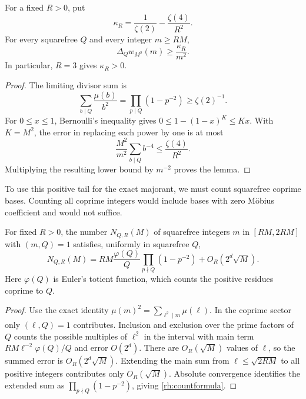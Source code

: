 \begin{lemma}\label{rh:positive}
For a fixed \(R>0\), put
\begin{equation}\label{rh:cr}
\kappa_R=\frac1{\zeta(2)}-\frac{\zeta(4)}{R^2}.
\end{equation}
For every squarefree \(Q\) and every integer \(m\ge RM\),
\begin{equation}\label{rh:positivebound}
\Delta_Qw_{M^2}(m)\ge\frac{\kappa_R}{m^2}.
\end{equation}
In particular, \(R=3\) gives \(\kappa_R>0\).
\end{lemma}

\begin{proof}
The limiting divisor sum is
\[
\sum_{b\mid Q}\frac{\mu(b)}{b^2}
=\prod_{p\mid Q}(1-p^{-2})\ge\zeta(2)^{-1}.
\]
For \(0\le x\le1\), Bernoulli's inequality gives
\(0\le1-(1-x)^K\le Kx\). With \(K=M^2\), the error in replacing each power by one is at most
\[
\frac{M^2}{m^2}\sum_{b\mid Q}b^{-4}
\le\frac{\zeta(4)}{R^2}.
\]
Multiplying the resulting lower bound by \(m^{-2}\) proves the lemma.
\end{proof}

To use this positive tail for the exact majorant, we must count squarefree coprime bases. Counting all coprime integers would include bases with zero Möbius coefficient and would not suffice.

\begin{lemma}\label{rh:count}
For fixed \(R>0\), the number \(N_{Q,R}(M)\) of squarefree integers \(m\) in \([RM,2RM]\) with \((m,Q)=1\) satisfies, uniformly in squarefree \(Q\),
\begin{equation}\label{rh:countformula}
N_{Q,R}(M)=RM\frac{\varphi(Q)}Q
\prod_{p\nmid Q}(1-p^{-2})+O_R(2^d\sqrt M).
\end{equation}
Here \(\varphi(Q)\) is Euler's totient function, which counts the positive residues coprime to \(Q\).
\end{lemma}

\begin{proof}
Use the exact identity \(\mu(m)^2=\sum_{\ell^2\mid m}\mu(\ell)\). In the coprime sector only \((\ell,Q)=1\) contributes. Inclusion and exclusion over the prime factors of \(Q\) counts the possible multiples of \(\ell^2\) in the interval with main term
\(RM\ell^{-2}\varphi(Q)/Q\) and error \(O(2^d)\).
There are \(O_R(\sqrt M)\) values of \(\ell\), so the summed error is \(O_R(2^d\sqrt M)\). Extending the main sum from \(\ell\le\sqrt{2RM}\) to all positive integers contributes only \(O_R(\sqrt M)\). Absolute convergence identifies the extended sum as \(\prod_{p\nmid Q}(1-p^{-2})\), giving \eqref{rh:countformula}.
\end{proof}

